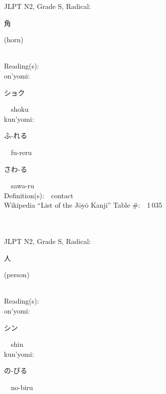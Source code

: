 \begin{multicols}{2}
{JLPT N2, Grade S, Radical:\ \ {\begin{CJK}{UTF8}{min} 角 \end{CJK}} (horn) } \\
Reading(s):\ \ \\
{\hspace*{1em}}on'yomi:\ \ \\
{\hspace*{2em}}{\begin{CJK}{UTF8}{min} ショク \end{CJK}}\ \ shoku\ \ \\
{\hspace*{1em}}kun'yomi:\ \ \\
{\hspace*{2em}}{\begin{CJK}{UTF8}{min} ふ-れる \end{CJK}}\ \ fu-reru\ \ \\
{\hspace*{2em}}{\begin{CJK}{UTF8}{min} さわ-る \end{CJK}}\ \ sawa-ru\ \ \\
Definition(s):\ \ contact \\
Wikipedia ``List of the J\=oy\=o Kanji'' Table \#:\ \ 1\,035 \\
\ \ \\
{\fontsize{34pt}{40pt}  }\ \ \\  %
{JLPT N2, Grade S, Radical:\ \ {\begin{CJK}{UTF8}{min} 人 \end{CJK}} (person) } \\
Reading(s):\ \ \\
{\hspace*{1em}}on'yomi:\ \ \\
{\hspace*{2em}}{\begin{CJK}{UTF8}{min} シン \end{CJK}}\ \ shin\ \ \\
{\hspace*{1em}}kun'yomi:\ \ \\
{\hspace*{2em}}{\begin{CJK}{UTF8}{min} の-びる \end{CJK}}\ \ no-biru\ \ \\

\end{multicols}
